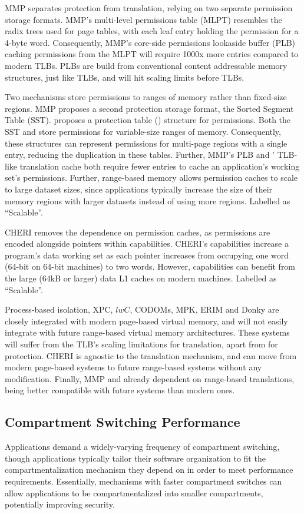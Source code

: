 MMP separates protection from translation, relying on two separate permission
storage formats.
MMP's multi-level permissions table (MLPT) resembles the radix trees used for
page tables, with each leaf entry holding the permission for a 4-byte word.
Consequently, MMP's core-side permissions lookaside buffer (PLB) caching
permissions from the MLPT will require 1000x more entries compared to modern
TLBs.
PLBs are build from conventional content addressable memory structures, just
like TLBs, and will hit scaling limits before TLBs.

Two mechanisms store permissions to ranges of memory rather than fixed-size
regions.
MMP proposes a second protection storage format, the Sorted Segment 
Table (SST).
\seccells proposes a protection table (\ptable) structure for permissions.
Both the SST and \ptable store permissions for variable-size ranges of memory.
Consequently, these structures can represent permissions for multi-page regions
with a single entry, reducing the duplication in these tables.
Further, MMP's PLB and \seccells' TLB-like translation cache both require fewer
entries to cache an application's working set's permissions.
Further, range-based memory allows permission caches to scale to large dataset
sizes, since applications typically increase the size of their memory regions
with larger datasets instead of using more regions.
Labelled as ``Scalable''.

CHERI removes the dependence on permission caches, as permissions are encoded
alongside pointers within capabilities.
CHERI's capabilities increase a program's data working set as each pointer
increases from occupying one word (64-bit on 64-bit machines) to two words.
However, capabilities can benefit from the large (64kB or larger) data 
L1 caches on modern machines.
Labelled as ``Scalable''.

Process-based isolation, XPC,  $lwC$, CODOMs, MPK, ERIM and Donky are closely
integrated with modern page-based virtual memory, and will not easily
integrate with future range-based virtual memory architectures.
These systems will suffer from the TLB's scaling limitations for translation,
apart from for protection.
CHERI is agnostic to the translation mechanism, and can move from modern
page-based systems to future range-based systems without any modification.
Finally, MMP and \seccells already dependent on range-based translations,
being better compatible with future systems than modern ones.

\subsection{Compartment Switching Performance}
Applications demand a widely-varying frequency of compartment switching,
though applications typically tailor their software organization to
fit the compartmentalization mechanism they depend on in order to meet
performance requirements.
Essentially, mechanisms with faster compartment switches can allow
applications to be compartmentalized into smaller compartments, potentially
improving security.

